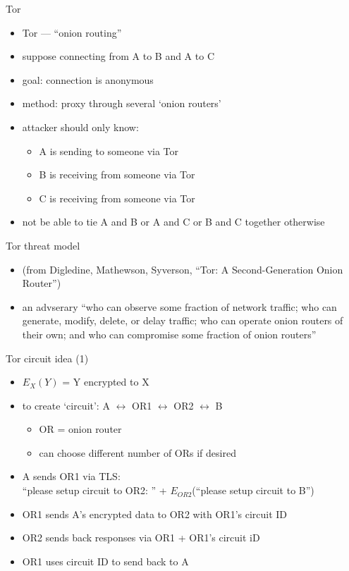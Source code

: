 \begin{frame}{Tor}
    \begin{itemize}
    \item Tor --- ``onion routing''
    \item suppose connecting from A to B and A to C
    \item goal: connection is anonymous
    \item method: proxy through several `onion routers'
    \vspace{.5cm}
    \item attacker should only know:
        \begin{itemize}
        \item A is sending to someone via Tor
        \item B is receiving from someone via Tor
        \item C is receiving from someone via Tor
        \end{itemize}
    \item not be able to tie A and B or A and C or B and C together otherwise
    \end{itemize}
\end{frame}

\begin{frame}{Tor threat model}
    \begin{itemize}
    \item (from Digledine, Mathewson, Syverson, ``Tor: A Second-Generation Onion Router'')
    \item an advserary ``who can observe some fraction of network traffic; who can generate, modify,
        delete, or delay traffic; who can operate onion routers of their own; and who can compromise some
        fraction of onion routers''
    \end{itemize}
\end{frame}

\begin{frame}{Tor circuit idea (1)}
    \begin{itemize}
    \item $E_X(Y)$ = Y encrypted to X
    \item to create `circuit': A $\leftrightarrow$ OR1 $\leftrightarrow$ OR2 $\leftrightarrow$ B
        \begin{itemize}
        \item OR = onion router
        \item can choose different number of ORs if desired
        \end{itemize}
    \item A sends OR1 via TLS: \\
        ``please setup circuit to OR2: '' + $E_{OR2}$(``please setup circuit to B'')
    \item OR1 sends A's encrypted data to OR2 with OR1's circuit ID
    \item OR2 sends back responses via OR1 + OR1's circuit iD
    \item OR1 uses circuit ID to send back to A
    \end{itemize}
\end{frame}

